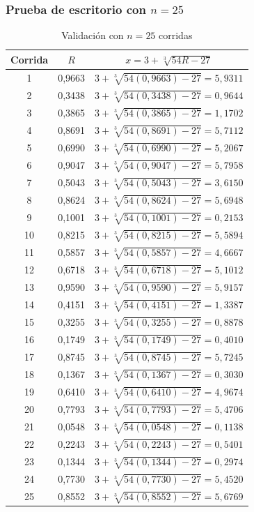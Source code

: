 \documentclass[12pt, a4paper]{article}
\newenvironment{mitabla}[2][H]{%
  \begin{table}[#1]
  \centering
  \caption{#2}
  \small
}{%
  \end{table}
}
\begin{document}
\subsubsection{\texorpdfstring{Prueba de escritorio con $n=25$}{Prueba de escritorio con n=25}}

\begin{mitabla}[H]{\texorpdfstring{Validación con $n=25$ corridas}{Validacion con n=25 corridas}}
\begin{tabular}{ccc}
\toprule
Corrida & $R$ & $x=3+\sqrt[3]{54R-27}$ \\
\midrule
1 & 0,9663 & $3+\sqrt[3]{54(0,9663)-27} = 5,9311$ \\
2 & 0,3438 & $3+\sqrt[3]{54(0,3438)-27} = 0,9644$ \\
3 & 0,3865 & $3+\sqrt[3]{54(0,3865)-27} = 1,1702$ \\
4 & 0,8691 & $3+\sqrt[3]{54(0,8691)-27} = 5,7112$ \\
5 & 0,6990 & $3+\sqrt[3]{54(0,6990)-27} = 5,2067$ \\
6 & 0,9047 & $3+\sqrt[3]{54(0,9047)-27} = 5,7958$ \\
7 & 0,5043 & $3+\sqrt[3]{54(0,5043)-27} = 3,6150$ \\
8 & 0,8624 & $3+\sqrt[3]{54(0,8624)-27} = 5,6948$ \\
9 & 0,1001 & $3+\sqrt[3]{54(0,1001)-27} = 0,2153$ \\
10 & 0,8215 & $3+\sqrt[3]{54(0,8215)-27} = 5,5894$ \\
11 & 0,5857 & $3+\sqrt[3]{54(0,5857)-27} = 4,6667$ \\
12 & 0,6718 & $3+\sqrt[3]{54(0,6718)-27} = 5,1012$ \\
13 & 0,9590 & $3+\sqrt[3]{54(0,9590)-27} = 5,9157$ \\
14 & 0,4151 & $3+\sqrt[3]{54(0,4151)-27} = 1,3387$ \\
15 & 0,3255 & $3+\sqrt[3]{54(0,3255)-27} = 0,8878$ \\
16 & 0,1749 & $3+\sqrt[3]{54(0,1749)-27} = 0,4010$ \\
17 & 0,8745 & $3+\sqrt[3]{54(0,8745)-27} = 5,7245$ \\
18 & 0,1367 & $3+\sqrt[3]{54(0,1367)-27} = 0,3030$ \\
19 & 0,6410 & $3+\sqrt[3]{54(0,6410)-27} = 4,9674$ \\
20 & 0,7793 & $3+\sqrt[3]{54(0,7793)-27} = 5,4706$ \\
21 & 0,0548 & $3+\sqrt[3]{54(0,0548)-27} = 0,1138$ \\
22 & 0,2243 & $3+\sqrt[3]{54(0,2243)-27} = 0,5401$ \\
23 & 0,1344 & $3+\sqrt[3]{54(0,1344)-27} = 0,2974$ \\
24 & 0,7730 & $3+\sqrt[3]{54(0,7730)-27} = 5,4520$ \\
25 & 0,8552 & $3+\sqrt[3]{54(0,8552)-27} = 5,6769$ \\
\bottomrule
\end{tabular}
\end{mitabla}
\end{document}
